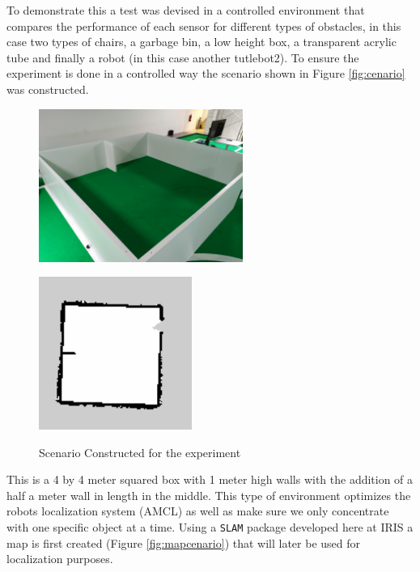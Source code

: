To demonstrate this a test was devised in a controlled environment that compares the performance of each sensor for different types of obstacles, in this case two types of chairs, a garbage bin, a low height box, a transparent acrylic tube and finally a robot (in this case another tutlebot2).  
To ensure the experiment is done in a controlled way the scenario shown in Figure \ref{fig:cenario} was constructed. 
\begin{figure}[ht!] 
    \begin{minipage}[t]{.49\linewidth}
        \includegraphics[height=5cm,width=\linewidth]{imgs/chapter5/mapP.jpg}
        \label{fig:cenario}
    \end{minipage}
    \begin{minipage}[t]{.49\linewidth}
        \includegraphics[height=5cm,width=\linewidth]{imgs/chapter5/map.png}
        \label{fig:mapcenario}
    \end{minipage}
    \caption{Scenario Constructed for the experiment}
    \label{fig:setup2}
\end{figure}
This is a 4 by 4 meter squared box with 1 meter high walls with the addition of a half a meter wall in length in the middle. This type of environment optimizes the robots localization system (\ac{AMCL}) as well as make sure we only concentrate with one specific object at a time. Using a \texttt{\ac{SLAM}} package developed here at \ac{IRIS} a map is first created (Figure \ref{fig:mapcenario}) that will later be used for localization purposes.

